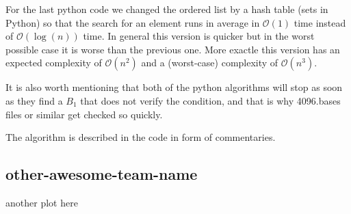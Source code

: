 \documentclass[11pt]{amsart}
\begin{document}
For the last python code we changed the ordered list by a hash table (sets in Python) so that the search for an element runs in average in $\mathcal{O}(1)$ time instead of $\mathcal{O}(\log(n))$ time.
In general this version is quicker but in the worst possible case it is worse than the previous one.
More exactle this version has an expected complexity of $\mathcal{O}(n^2)$ and a (worst-case) complexity of $\mathcal{O}(n^3)$.

It is also worth mentioning that both of the python algorithms will stop as soon as they find a $B_1$ that does not verify the condition, and that is why 4096.bases files or similar get checked so quickly.

The algorithm is described in the code in form of commentaries.


\subsection{other-awesome-team-name}

another plot here
\end{document}
